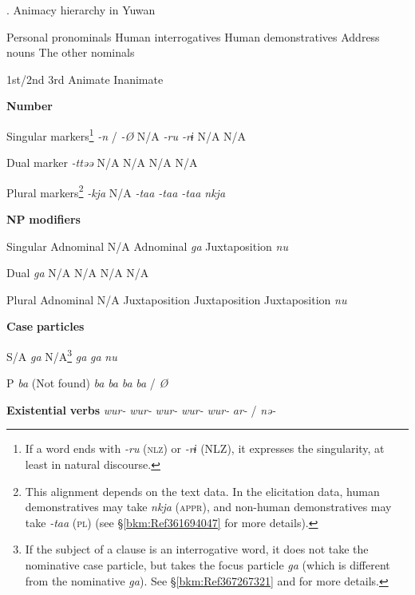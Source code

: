 \begin{styleBeschriftung}
\textmd{}\textmd{. Animacy hierarchy in Yuwan}
\end{styleBeschriftung}

  Personal pronominals  Human interrogatives  Human demonstratives  Address nouns  The other nominals

  1st/2nd  3rd        Animate  Inanimate

\textbf{Number}          

Singular markers\footnote{If a word ends with \textit{{}-ru} (\textsc{nlz}) or \textit{{}-rɨ} (NLZ), it expresses the singularity, at least in natural discourse.}  \textit{{}-n} / \textit{-Ø}  N/A  \textit{{}-ru  {}-rɨ} N/A  N/A

Dual marker     \textit{{}-ttəə} N/A  N/A  N/A  N/A

Plural markers\footnote{This alignment depends on the text data. In the elicitation data, human demonstratives may take \textit{nkja} (\textsc{appr}), and non-human demonstratives may take \textit{{}-taa} (\textsc{pl}) (see §\ref{bkm:Ref361694047} for more details).}  \textit{{}-kja} N/A  \textit{{}-taa  {}-taa  {}-taa  nkja}

\textbf{NP} \textbf{modifiers}          

Singular  Adnominal  N/A  Adnominal  \textit{ga}  Juxtaposition  \textit{nu}

Dual     \textit{ga}  N/A  N/A  N/A  N/A

Plural  Adnominal  N/A  Juxtaposition  Juxtaposition  Juxtaposition  \textit{nu}

\textbf{Case} \textbf{particles}          

S/A     \textit{ga}  N/A\footnote{If the subject of a clause is an interrogative word, it does not take the nominative case particle, but takes the focus particle \textit{ga} (which is different from the nominative \textit{ga}). See §\ref{bkm:Ref367267321} and  for more details.}  \textit{ga}  \textit{ga}  \textit{nu}

P     \textit{ba}  (Not found)  \textit{ba}  \textit{ba}  \textit{ba}  \textit{ba} / \textit{Ø}

\textbf{Existential} \textbf{verbs}      \textit{wur-}  \textit{wur-}  \textit{wur-}  \textit{wur-}  \textit{wur-}  \textit{ar-} / \textit{nə-}

